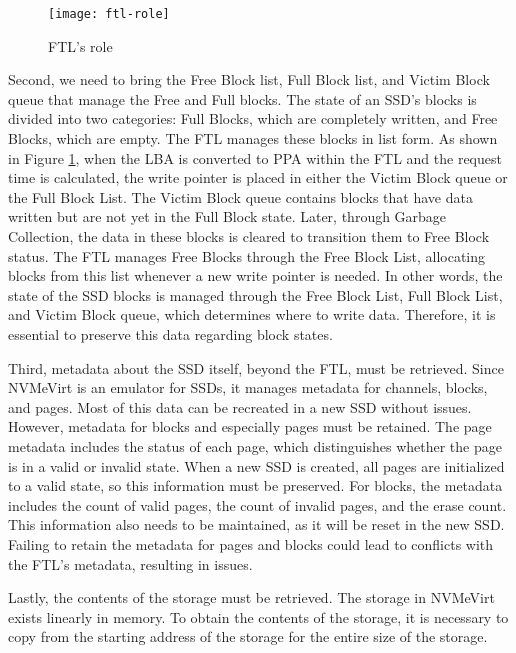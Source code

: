 \begin{figure}[t]
    \centering
    \texttt{[image: ftl-role]}
    \caption{FTL’s role}
    \label{fig:role}
\end{figure}

Second, we need to bring the Free Block list, Full Block list, and Victim Block queue that manage the Free and Full blocks.
The state of an SSD's blocks is divided into two categories: Full Blocks, which are completely written, and Free Blocks, which are empty.
The FTL manages these blocks in list form.
As shown in Figure \ref{fig:role}, when the LBA is converted to PPA within the FTL and the request time is calculated, the write pointer is placed in either the Victim Block queue or the Full Block List.
The Victim Block queue contains blocks that have data written but are not yet in the Full Block state.
Later, through Garbage Collection, the data in these blocks is cleared to transition them to Free Block status.
The FTL manages Free Blocks through the Free Block List, allocating blocks from this list whenever a new write pointer is needed.
In other words, the state of the SSD blocks is managed through the Free Block List, Full Block List, and Victim Block queue, which determines where to write data.
Therefore, it is essential to preserve this data regarding block states.

Third, metadata about the SSD itself, beyond the FTL, must be retrieved.
Since NVMeVirt is an emulator for SSDs, it manages metadata for channels, blocks, and pages.
Most of this data can be recreated in a new SSD without issues.
However, metadata for blocks and especially pages must be retained.
The page metadata includes the status of each page, which distinguishes whether the page is in a valid or invalid state.
When a new SSD is created, all pages are initialized to a valid state, so this information must be preserved.
For blocks, the metadata includes the count of valid pages, the count of invalid pages, and the erase count.
This information also needs to be maintained, as it will be reset in the new SSD.
Failing to retain the metadata for pages and blocks could lead to conflicts with the FTL's metadata, resulting in issues.

Lastly, the contents of the storage must be retrieved.
The storage in NVMeVirt exists linearly in memory.
To obtain the contents of the storage, it is necessary to copy from the starting address of the storage for the entire size of the storage.


